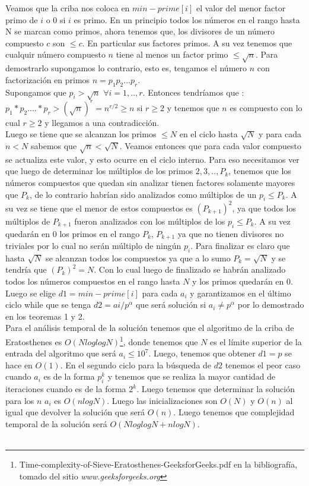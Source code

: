 \documentclass[12pt]{article}
\begin{document}
Veamos que la criba nos coloca en $min-prime[i]$ el valor del menor factor primo de $i$ o $0$ si $i$ es primo. En un principio todos los 
n\'umeros en el rango hasta N se marcan como primos, ahora tenemos que, los divisores de un n\'umero compuesto $c$ son $\leq c$. En particular sus factores primos. A su vez tenemos que cualquir n\'umero compuesto $n$ tiene al menos un factor primo $\leq \sqrt{n}$.
Para demostrarlo supongamos lo contrario, esto es, tengamos el n\'umero $n$ con factorizaci\'on en primos $n=p_1p_2...p_r$.\\
Supongamos que $p_i>\sqrt{n}$ $\forall i=1,..,r$. Entonces tendr\'iamos que :\\
$p_1*p_2....*p_r > (\sqrt{n})^r = n^{r/2} \geq n$ si $r\geq 2$ y tenemos que $n$ es compuesto con lo cual $r\geq 2$ y llegamos a una 
contradicci\'on. \\
Luego se tiene que se alcanzan los primos $\leq {N}$ en el ciclo hasta $\sqrt{N}$ y para cada $n<N$ sabemos que
 $\sqrt{n}<\sqrt{N}$. Veamos entonces que para cada valor compuesto se actualiza este valor, y esto ocurre en el ciclo interno. Para eso necesitamos ver que luego de determinar los m\'ultiplos de los primos $2,3,..,P_k$, tenemos que los n\'umeros compuestos que quedan sin analizar tienen factores solamente mayores que $P_k$, de lo contrario habr\'ian sido analizados como m\'ultiplos de un $p_i\leq P_k$.  A su vez se tiene que el menor de estos compuestos es $(P_{k+1})^{2}$, ya que todos los m\'ultiplos de $P_{k+1}$ fueron analizados con los m\'ultiplos de los $p_i\leq P_k$. A su vez quedar\'an en $0$ los primos en el rango $P_k$, $P_{k+1}$ ya que no tienen divisores no triviales por lo cual no 
ser\'an m\'ultiplo de ning\'un $p_i$. Para finalizar es claro que hasta $\sqrt{N}$ se alcanzan todos los compuestos ya que a lo sumo $P_k = \sqrt{N}$ y se tendr\'ia que 
$(P_{k})^{2}=N$. Con lo cual luego de finalizado se habr\'an analizado todos los n\'umeros compuestos en el rango hasta $N$ y los primos quedar\'an en $0$.\\
Luego se elige $d1 = min-prime[i]$ para cada $a_i$ y garantizamos en el \'ultimo ciclo while que se tenga 
$d2 = ai/p^{\alpha}$ que ser\'a soluci\'on si $a_i \neq p^{\alpha}$ por lo demostrado en los teoremas 1 y 2.\\
       

Para el an\'alisis temporal de la soluci\'on tenemos que el algoritmo de la criba de Eratosthenes es 
$O(NloglogN)$\footnote{Time-complexity-of-Sieve-Eratosthenes-GeeksforGeeks.pdf en la bibliograf\'ia, tomado del sitio \textit{www.geeksforgeeks.org}}, donde tenemos que 
$N$ es el l\'imite superior de la entrada del algoritmo que ser\'a $a_i\leq 10^7$. Luego, tenemos que obtener $d1=p$ se hace en $O(1)$. En el segundo ciclo para la b\'usqueda de $d2$ tenemos el peor caso cuando $a_i$ es de la forma $p_{i}^{k}$ y tenemos que se realiza la mayor cantidad de iteraciones cuando es de la forma $2^k$. Luego tenemos que determinar la soluci\'on para los $n$ $a_i$ es $O(nlogN)$. Luego las inicializaciones son $O(N)$ y $O(n)$ al igual que devolver la soluci\'on que ser\'a $O(n)$. Luego 
tenemos que complejidad temporal de la soluci\'on ser\'a $O(NloglogN+nlogN)$.\\
\\
\end{document}
